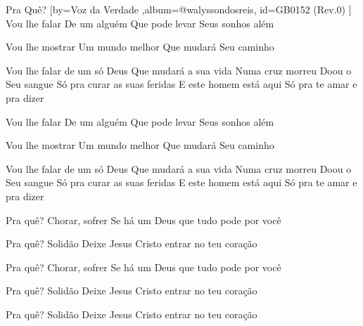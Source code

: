 \beginsong
{Pra Quê? %
}[by={Voz da Verdade %
},album={@walyssondosreis},
id={GB0152 %
(Rev.0) %
}]
Vou lhe falar
De um alguém
Que pode levar
Seus sonhos além

Vou lhe mostrar
Um mundo melhor
Que mudará
Seu caminho

Vou lhe falar de um só Deus
Que mudará a sua vida
Numa cruz morreu
Doou o Seu sangue
Só pra curar as suas feridas
E este homem está aqui
Só pra te amar e pra dizer

Vou lhe falar
De um alguém
Que pode levar
Seus sonhos além

Vou lhe mostrar
Um mundo melhor
Que mudará
Seu caminho

Vou lhe falar de um só Deus
Que mudará a sua vida
Numa cruz morreu
Doou o Seu sangue
Só pra curar as suas feridas
E este homem está aqui
Só pra te amar e pra dizer

Pra quê?
Chorar, sofrer
Se há um Deus que tudo pode por você

Pra quê?
Solidão
Deixe Jesus Cristo entrar no teu coração

Pra quê?
Chorar, sofrer
Se há um Deus que tudo pode por você

Pra quê?
Solidão
Deixe Jesus Cristo entrar no teu coração

Pra quê?
Solidão
Deixe Jesus Cristo entrar no teu coração


